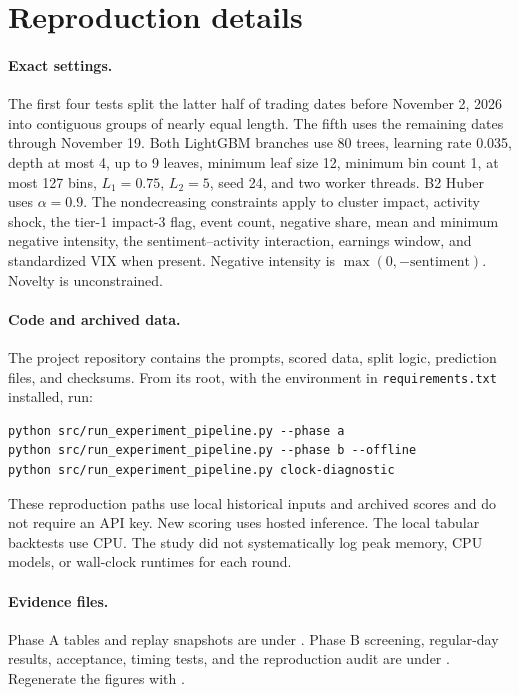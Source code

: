 \documentclass{article}
\begin{document}
\section{Reproduction details}
\label{app:reproduction}

\paragraph{Exact settings.}
The first four tests split the latter half of trading dates before November 2, 2026 into contiguous groups of nearly equal length. The fifth uses the remaining dates through November 19. Both LightGBM branches use 80 trees, learning rate 0.035, depth at most 4, up to 9 leaves, minimum leaf size 12, minimum bin count 1, at most 127 bins, $L_1=0.75$, $L_2=5$, seed 24, and two worker threads. B2 Huber uses $\alpha=0.9$. The nondecreasing constraints apply to cluster impact, activity shock, the tier-1 impact-3 flag, event count, negative share, mean and minimum negative intensity, the sentiment--activity interaction, earnings window, and standardized VIX when present. Negative intensity is $\max(0,-\mathrm{sentiment})$. Novelty is unconstrained.

\paragraph{Code and archived data.}
The project repository contains the prompts, scored data, split logic, prediction files, and checksums. From its root, with the environment in \texttt{requirements.txt} installed, run:
\begin{verbatim}
python src/run_experiment_pipeline.py --phase a
python src/run_experiment_pipeline.py --phase b --offline
python src/run_experiment_pipeline.py clock-diagnostic
\end{verbatim}
These reproduction paths use local historical inputs and archived scores and do not require an API key. New scoring uses hosted inference. The local tabular backtests use CPU. The study did not systematically log peak memory, CPU models, or wall-clock runtimes for each round.

\paragraph{Evidence files.}
Phase A tables and replay snapshots are under . Phase B screening, regular-day results, acceptance, timing tests, and the reproduction audit are under . Regenerate the figures with .

\clearpage

\end{document}
